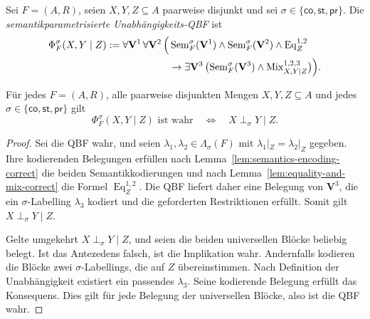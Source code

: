 \begin{Definition}
    \label{def:generic-independence-qbf}
    Sei \(F=(A,R)\), seien \(X,Y,Z\subseteq A\) paarweise disjunkt und sei
    \(\sigma\in\{\mathsf{co},\mathsf{st},\mathsf{pr}\}\). Die
    \emph{semantikparametrisierte Unabhängigkeits-QBF} ist
    \[
    \begin{split}
        \Phi^\sigma_F(X,Y\mid Z)
        :=\forall\mathbf V^1\,\forall\mathbf V^2\,
        \Bigl(&
            \operatorname{Sem}^{\sigma}_F(\mathbf V^1)
            \land
            \operatorname{Sem}^{\sigma}_F(\mathbf V^2)
            \land
            \operatorname{Eq}^{1,2}_Z
        \\
        &\rightarrow
        \exists\mathbf V^3\,
        \bigl(
            \operatorname{Sem}^{\sigma}_F(\mathbf V^3)
            \land
            \operatorname{Mix}^{1,2,3}_{X,Y\mid Z}
        \bigr)
        \Bigr).
    \end{split}
    \]
\end{Definition}

\begin{Theorem}
    \label{thm:generic-independence-qbf-correct}
    Für jedes \(F=(A,R)\), alle paarweise disjunkten Mengen
    \(X,Y,Z\subseteq A\) und jedes
    \(\sigma\in\{\mathsf{co},\mathsf{st},\mathsf{pr}\}\) gilt
    \[
        \Phi^\sigma_F(X,Y\mid Z)\text{ ist wahr}
        \quad\Longleftrightarrow\quad
        X\perp_\sigma Y\mid Z.
    \]
\end{Theorem}

\begin{proof}
    Sei die QBF wahr, und seien
    \(\lambda_1,\lambda_2\in\Lambda_\sigma(F)\) mit
    \(\lambda_1|_Z=\lambda_2|_Z\) gegeben. Ihre kodierenden Belegungen
    erfüllen nach Lemma~\ref{lem:semantics-encoding-correct} die beiden
    Semantikkodierungen und nach
    Lemma~\ref{lem:equality-and-mix-correct} die Formel
    \(\operatorname{Eq}^{1,2}_Z\). Die QBF liefert daher eine Belegung von
    \(\mathbf V^3\), die ein \(\sigma\)-Labelling \(\lambda_3\) kodiert
    und die geforderten Restriktionen erfüllt. Somit gilt
    \(X\perp_\sigma Y\mid Z\).

    Gelte umgekehrt \(X\perp_\sigma Y\mid Z\), und seien die beiden
    universellen Blöcke beliebig belegt. Ist das Antezedens falsch, ist die
    Implikation wahr. Andernfalls kodieren die Blöcke zwei
    \(\sigma\)-Labellings, die auf \(Z\) übereinstimmen. Nach Definition
    der Unabhängigkeit existiert ein passendes \(\lambda_3\). Seine
    kodierende Belegung erfüllt das Konsequens. Dies gilt für jede Belegung
    der universellen Blöcke, also ist die QBF wahr.
\end{proof}

